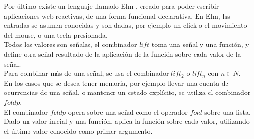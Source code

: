 

Por último existe un lenguaje llamado Elm \cite{evanczaplicki2012:Elm}, creado para
poder escribir aplicaciones web reactivas, de una forma funcional declarativa.
  En Elm, las entradas se asumen conocidas y son dadas, por ejemplo un click o el movimiento del mouse,
o una tecla presionada.\\
  Todos los valores son señales, el combinador $lift$
toma una señal y una función, y define otra señal resultado de la aplicación de la función
sobre cada valor de la señal.\\
  Para combinar más de una señal, se usa el combinador $lift_2$ o $lift_n$ con $n \in N$.\\
  En los casos que se desea tener memoria, por ejemplo llevar una cuenta de ocurrencias
  de una señal, o mantener un estado explícito, se utiliza el combinador $foldp$.\\

  El combinador $foldp$ opera sobre una señal como el operador $fold$ sobre una lista. Dado
un valor inicial y una función, aplica la función sobre cada valor, utilizando el último
valor conocido como primer argumento.


